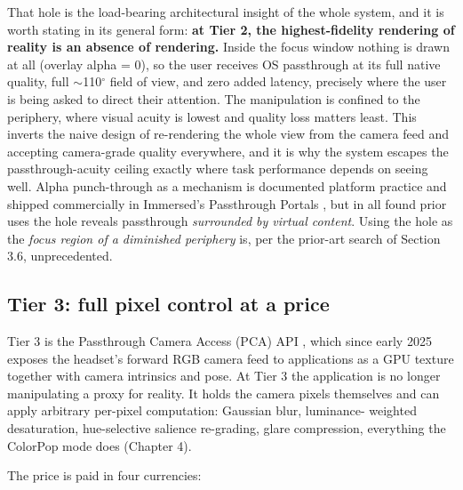 That hole is the load-bearing architectural insight of the whole system, and it is worth stating in
its general form: \textbf{at Tier 2, the highest-fidelity rendering of reality is an absence of
rendering.} Inside the focus window nothing is drawn at all (overlay alpha = 0), so the user
receives OS passthrough at its full native quality, full $\sim$110$^{\circ}$ field of view, and zero added
latency, precisely where the user is being asked to direct their attention. The manipulation is
confined to the periphery, where visual acuity is lowest and quality loss matters least. This
inverts the naive design of re-rendering the whole view from the camera feed and accepting
camera-grade quality everywhere, and it is why the system escapes the passthrough-acuity ceiling
exactly where task performance depends on seeing well. Alpha punch-through as a mechanism is
documented platform practice \citep{meta2024b} and shipped commercially in
Immersed's Passthrough Portals \citep{immersed2022}, but in all found prior uses the hole reveals
passthrough \textit{surrounded by virtual content}. Using the hole as the \textit{focus region of a diminished
periphery} is, per the prior-art search of Section 3.6, unprecedented.

\subsection{Tier 3: full pixel control at a price}

Tier 3 is the Passthrough Camera Access (PCA) API \citep{meta2025}, which since early 2025 exposes the
headset's forward RGB camera feed to applications as a GPU texture together with camera intrinsics
and pose. At Tier 3 the application is no longer manipulating a proxy for reality. It holds the
camera pixels themselves and can apply arbitrary per-pixel computation: Gaussian blur, luminance-
weighted desaturation, hue-selective salience re-grading, glare compression, everything the ColorPop mode does (Chapter 4).

The price is paid in four currencies:

